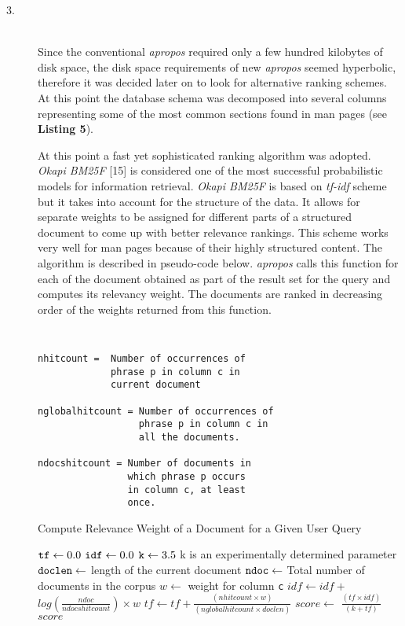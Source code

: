 \documentclass[letterpaper,twocolumn,10pt]{article}
\begin{document}
\begin{description}
\item[3.] \hfill \\
Since the conventional \textit{apropos} required only a few hundred kilobytes of
disk space, the disk space requirements of new \textit{apropos} seemed
hyperbolic, therefore it was decided later on to look for alternative ranking
schemes. At this point the database schema was decomposed into several columns
representing some of the most common sections found in man pages
(see {\bf Listing 5}).

At this point a fast yet sophisticated ranking algorithm was adopted.
\emph{Okapi BM25F} [15] is considered one of the most successful probabilistic
models for information retrieval. \emph{Okapi BM25F} is based on \emph{tf-idf}
scheme but it takes into account for the structure of the data. It allows for
separate weights to be assigned for different parts of a structured document to
come up with better relevance rankings. This scheme works very well for man pages
because of their highly structured content. The algorithm is described in pseudo-code below. \textit{apropos} calls this function for each of the document
obtained as part of the result set for the query and computes its relevancy
weight. The documents are ranked in decreasing order of the weights returned
from this function. \\

{\tt
{}
\begin{lstlisting}
nhitcount =  Number of occurrences of
             phrase p in column c in
             current document

nglobalhitcount = Number of occurrences of
                  phrase p in column c in
                  all the documents.

ndocshitcount = Number of documents in
                which phrase p occurs
                in column c, at least
                once.
\end{lstlisting}
}
\begin{algorithm}
\caption{Compute Relevance Weight of a Document for a Given User Query}
\label{alg1}
\begin{algorithmic}[1]
\State ${\tt tf} \gets 0.0$
\State ${\tt idf} \gets 0.0$
\State ${\tt k} \gets 3.5$
\Comment 
{k is an experimentally determined parameter}
\State ${\tt doclen} \gets $ length of the current document
\State ${\tt ndoc} \gets $ Total number of documents in the corpus
\State $w \gets $ weight for column {\tt c}
\State $idf \gets idf + $ $log(\frac{ndoc}{ndocshitcount})\times w $
\State $tf \gets tf + \frac{(nhitcount \times w)}{(nglobalhitcount \times doclen)}$
\EndFor
\EndFor
\State $score \gets $ $\frac{(tf \times idf)}{(k + tf)}$ \\
\Return $score$
\end{algorithmic}
\end{algorithm}
\end{description}
\end{document}

